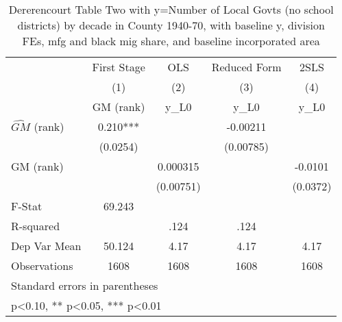 \begin{table}[htbp]\centering
\def\sym#1{\ifmmode^{#1}\else\(^{#1}\)\fi}
\caption{Dererencourt Table Two with y=Number of Local Govts (no school districts) by decade in County 1940-70, with baseline y, division FEs, mfg and black mig share, and baseline incorporated area}
\begin{tabular}{l*{4}{c}}
\toprule
                    & First Stage   &         OLS   &Reduced Form   &        2SLS   \\
                    &\multicolumn{1}{c}{(1)}&\multicolumn{1}{c}{(2)}&\multicolumn{1}{c}{(3)}&\multicolumn{1}{c}{(4)}\\
                    &\multicolumn{1}{c}{GM  (rank)}&\multicolumn{1}{c}{y\_L0}&\multicolumn{1}{c}{y\_L0}&\multicolumn{1}{c}{y\_L0}\\
\midrule
$\hat{GM}$ (rank)   &       0.210***&               &    -0.00211   &               \\
                    &    (0.0254)   &               &   (0.00785)   &               \\
\addlinespace
GM  (rank)          &               &    0.000315   &               &     -0.0101   \\
                    &               &   (0.00751)   &               &    (0.0372)   \\
\midrule
F-Stat              &      69.243   &               &               &               \\
R-squared           &               &        .124   &        .124   &               \\
Dep Var Mean        &      50.124   &        4.17   &        4.17   &        4.17   \\
Observations        &        1608   &        1608   &        1608   &        1608   \\
\bottomrule
\multicolumn{5}{l}{\footnotesize Standard errors in parentheses}\\
\multicolumn{5}{l}{\footnotesize * p<0.10, ** p<0.05, *** p<0.01}\\
\end{tabular}
\end{table}
